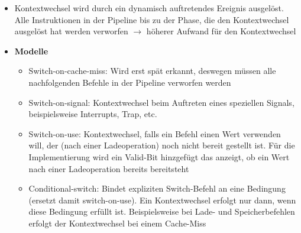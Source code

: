 \begin{itemize}
	\begin{itemize}
		\item Kontextwechsel wird durch ein dynamisch auftretendes Ereignis ausgelöst. Alle Instruktionen in der Pipeline bis zu der Phase, die den Kontextwechsel ausgelöst hat werden verworfen \(\rightarrow\) höherer Aufwand für den Kontextwechsel
		\item \textbf{Modelle}
		\begin{itemize}
			\item Switch-on-cache-miss: Wird erst spät erkannt, deswegen müssen alle nachfolgenden Befehle in der Pipeline verworfen werden
			\item Switch-on-signal: Kontextwechsel beim Auftreten eines speziellen Signals, beispielsweise Interrupts, Trap, etc.
			\item Switch-on-use: Kontextwechsel, falls ein Befehl einen Wert verwenden will, der (nach einer Ladeoperation) noch nicht bereit gestellt ist. Für die Implementierung wird ein Valid-Bit hinzgefügt das anzeigt, ob ein Wert nach einer Ladeoperation bereits bereitsteht
			\item Conditional-switch: Bindet expliziten Switch-Befehl an eine Bedingung (ersetzt damit switch-on-use). Ein Kontextwechsel erfolgt nur dann, wenn diese Bedingung erfüllt ist. Beispielsweise bei Lade- und Speicherbefehlen erfolgt der Kontextwechsel bei einem Cache-Miss
		\end{itemize}
	\end{itemize}
\end{itemize}

